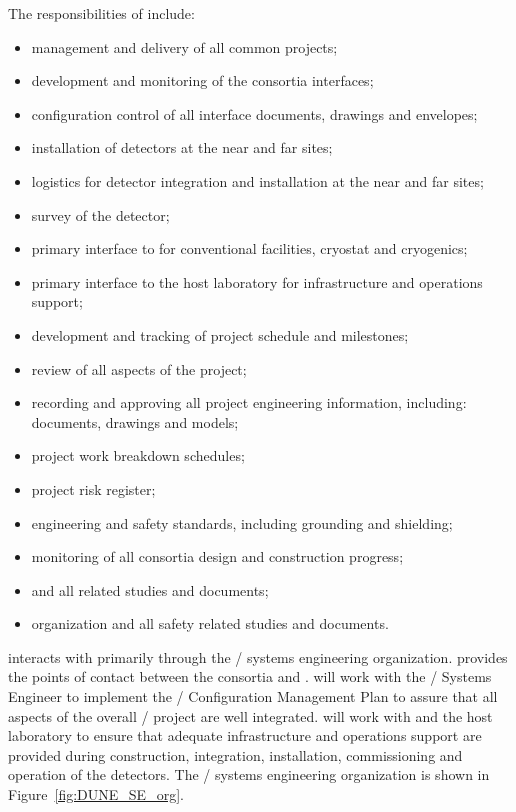 The responsibilities of  include:
\begin{itemize}
  \item management and delivery of all common projects;
  \item development and monitoring of the consortia interfaces;
  \item configuration control of all interface documents, drawings and envelopes;
  \item installation of detectors at the near and far sites;
  \item logistics for detector integration and installation at the near and far sites;
  \item survey of the detector;
  \item primary interface to  for conventional facilities, cryostat and cryogenics;
  \item primary interface to the host laboratory for infrastructure and operations support;
  \item development and tracking of project schedule and milestones;
  \item review of all aspects of the project;
  \item recording and approving all project engineering information, including: documents, drawings and models;
  \item project work breakdown schedules;
  \item project risk register;
  \item {} engineering and safety standards, including grounding and shielding;
  \item monitoring of all consortia design and construction progress;
  \item {} and all  related studies and documents;
  \item {} organization and all safety related studies and documents.
\end {itemize}

  interacts with  primarily through the
/ systems engineering organization. 
provides the points of contact between the consortia and .
 will work with the / Systems Engineer to
implement the / Configuration Management Plan
to assure that all aspects of the overall /
project are well integrated.  will work with  and the
host laboratory to ensure that adequate infrastructure and operations support
are provided during construction, integration, installation,
commissioning and operation of the detectors. The /  systems
engineering organization is shown in Figure~\ref{fig:DUNE_SE_org}.

